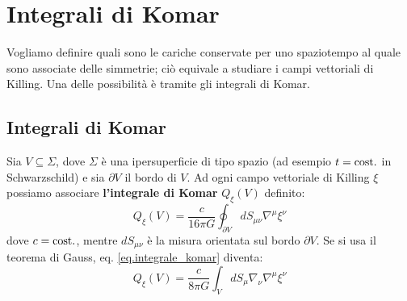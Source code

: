 \chapter{Integrali di Komar}
Vogliamo definire quali sono le cariche conservate per uno spaziotempo al quale sono associate delle simmetrie; ciò equivale a studiare i campi vettoriali di Killing. Una delle possibilità è tramite gli integrali di Komar.

\section{Integrali di Komar}
Sia $V \subseteq \Sigma$, dove $\Sigma$ è una ipersuperficie di tipo spazio (ad esempio $t=\textrm{cost.}$ in Schwarzschild) e sia $\partial V$ il bordo di $V$. Ad ogni campo vettoriale di Killing $\xi$ possiamo associare \textbf{l'integrale di Komar} $Q_\xi(V)$ definito:
\begin{equation}
    Q_\xi(V) = \frac{c}{16\pi G}\oint_{\partial V}dS_{\mu\nu}\nabla^\mu \xi^\nu
    \label{eq.integrale_komar}
\end{equation}
dove $c=\textrm{cost.}$, mentre $dS_{\mu\nu}$ è la misura orientata sul bordo $\partial V$. Se si usa il teorema di Gauss, eq. \ref{eq.integrale_komar} diventa:
\begin{equation}
    Q_\xi(V) = \frac{c}{8\pi G}\int_V dS_\mu \nabla_\nu\nabla^\mu \xi^\nu
    \label{eq.integrale_komar_gauss}
\end{equation}

